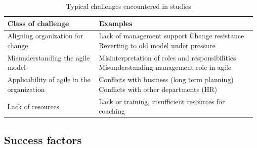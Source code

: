 \documentclass[lnbip]{svmultln}
\begin{document}
\begin{table}[h]
    \begin{tabular}{ p{} p{} }
        \toprule
        Class of challenge  & Examples   \\ \midrule
        
        \raggedright Aligning organization for change  &
             Lack of management support \newline
             Change resistance \newline
             Reverting to old model under pressure \\ 
        
        \raggedright\rule{0pt}{0.4cm}Misunderstanding the agile model  &
             Misinterpretation of roles and responsibilities \newline
             Misunderstanding management role in agile \\
        
        \raggedright\rule{0pt}{0.4cm}Applicability of agile in the organization  &
            Conflicts with business (long term planning) \newline
            Conflicts with other departments (HR) \\
        
        \raggedright\rule{0pt}{0.4cm}Lack of resources  &
            Lack or training, insufficient resources for coaching \\
        \bottomrule
    \end{tabular}
    \caption{Typical challenges encountered in studies}
    \label{table:challenges}
\end{table}


\subsection{Success factors}
\end{document}
